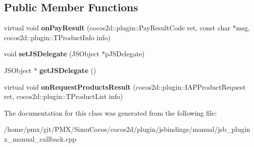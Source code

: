 \subsection*{Public Member Functions}
\begin{DoxyCompactItemize}
\item 
\mbox{\label{classPluginx__PurchaseResult_a960d19812914637689bf75c7a66b87cc}} 
virtual void {\bfseries on\+Pay\+Result} (cocos2d\+::plugin\+::\+Pay\+Result\+Code ret, const char $\ast$msg, cocos2d\+::plugin\+::\+T\+Product\+Info info)
\item 
\mbox{\label{classPluginx__PurchaseResult_ae459e737112b8c54a995a887a5896025}} 
void {\bfseries set\+J\+S\+Delegate} (J\+S\+Object $\ast$p\+J\+S\+Delegate)
\item 
\mbox{\label{classPluginx__PurchaseResult_af41c5cb2172c21051e98a9e1bbb539ca}} 
J\+S\+Object $\ast$ {\bfseries get\+J\+S\+Delegate} ()
\item 
\mbox{\label{classPluginx__PurchaseResult_a6b29ae0bac7978c23092cd9398098863}} 
virtual void {\bfseries on\+Request\+Products\+Result} (cocos2d\+::plugin\+::\+I\+A\+P\+Product\+Request ret, cocos2d\+::plugin\+::\+T\+Product\+List info)
\end{DoxyCompactItemize}


The documentation for this class was generated from the following file\+:\begin{DoxyCompactItemize}
\item 
/home/pmx/git/\+P\+M\+X/\+Simu\+Cocos/cocos2d/plugin/jsbindings/manual/jsb\+\_\+pluginx\+\_\+manual\+\_\+callback.\+cpp\end{DoxyCompactItemize}
